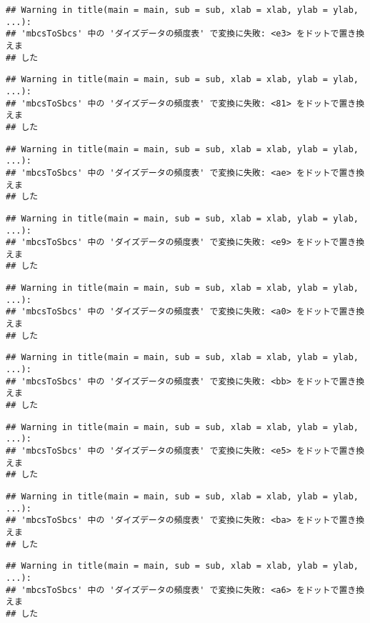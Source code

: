 \documentclass[
]{article}
\begin{document}
\begin{verbatim}
## Warning in title(main = main, sub = sub, xlab = xlab, ylab = ylab, ...):
## 'mbcsToSbcs' 中の 'ダイズデータの頻度表' で変換に失敗: <e3> をドットで置き換えま
## した
\end{verbatim}

\begin{verbatim}
## Warning in title(main = main, sub = sub, xlab = xlab, ylab = ylab, ...):
## 'mbcsToSbcs' 中の 'ダイズデータの頻度表' で変換に失敗: <81> をドットで置き換えま
## した
\end{verbatim}

\begin{verbatim}
## Warning in title(main = main, sub = sub, xlab = xlab, ylab = ylab, ...):
## 'mbcsToSbcs' 中の 'ダイズデータの頻度表' で変換に失敗: <ae> をドットで置き換えま
## した
\end{verbatim}

\begin{verbatim}
## Warning in title(main = main, sub = sub, xlab = xlab, ylab = ylab, ...):
## 'mbcsToSbcs' 中の 'ダイズデータの頻度表' で変換に失敗: <e9> をドットで置き換えま
## した
\end{verbatim}

\begin{verbatim}
## Warning in title(main = main, sub = sub, xlab = xlab, ylab = ylab, ...):
## 'mbcsToSbcs' 中の 'ダイズデータの頻度表' で変換に失敗: <a0> をドットで置き換えま
## した
\end{verbatim}

\begin{verbatim}
## Warning in title(main = main, sub = sub, xlab = xlab, ylab = ylab, ...):
## 'mbcsToSbcs' 中の 'ダイズデータの頻度表' で変換に失敗: <bb> をドットで置き換えま
## した
\end{verbatim}

\begin{verbatim}
## Warning in title(main = main, sub = sub, xlab = xlab, ylab = ylab, ...):
## 'mbcsToSbcs' 中の 'ダイズデータの頻度表' で変換に失敗: <e5> をドットで置き換えま
## した
\end{verbatim}

\begin{verbatim}
## Warning in title(main = main, sub = sub, xlab = xlab, ylab = ylab, ...):
## 'mbcsToSbcs' 中の 'ダイズデータの頻度表' で変換に失敗: <ba> をドットで置き換えま
## した
\end{verbatim}

\begin{verbatim}
## Warning in title(main = main, sub = sub, xlab = xlab, ylab = ylab, ...):
## 'mbcsToSbcs' 中の 'ダイズデータの頻度表' で変換に失敗: <a6> をドットで置き換えま
## した
\end{verbatim}
\end{document}
